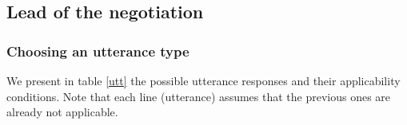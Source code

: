 \documentclass{llncs}
\begin{document}
			

	\subsection{Lead of the negotiation}
	

	\subsubsection{Choosing an utterance type}
	
	
	We present in table \ref{utt} the possible utterance responses and their applicability conditions. Note that each line (utterance) assumes that the previous ones are already not applicable.%
	
\end{document}
